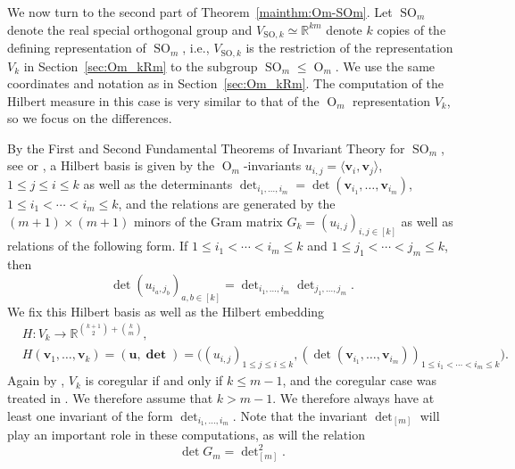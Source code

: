 \documentclass[twoside]{amsart}
\theoremstyle{definition}
\theoremstyle{remark}
\numberwithin{equation}{section}
\newcommand{\R}{\mathbb{R}}
\newcommand{\OO}{\operatorname{O}}
\newcommand{\SO}{\operatorname{SO}}
\begin{document}
We now turn to the second part of Theorem~\ref{mainthm:Om-SOm}.
Let $\SO_m$ denote the real special orthogonal group and $V_{\text{SO},k}\simeq\R^{km}$ denote $k$ copies of the defining representation of $\SO_m$, i.e.,
$V_{\text{SO},k}$ is the restriction of the representation $V_k$ in Section~\ref{sec:Om_kRm} to the subgroup $\SO_m \leq \OO_m$. We use the same coordinates
and notation as in Section~\ref{sec:Om_kRm}. The computation of the Hilbert measure in this case is very similar to that of the $\OO_m$ representation $V_k$,
so we focus on the differences.

By the First and Second Fundamental Theorems of Invariant Theory for $\SO_m$, see \cite[Sec.~9.2 and 9.4]{PopovVinberg} or \cite[Ch.~11, Sec.~2.1 and 5.2]{ProcesiLieGroups},
a Hilbert basis is given by the $\OO_m$-invariants $u_{i,j} = \langle\mathbf{v}_i,\mathbf{v}_j\rangle$, $1\leq j\leq i\leq k$ as well as the determinants
$\det\nolimits_{i_1,\ldots,i_m} = \det(\mathbf{v}_{i_1},\ldots,\mathbf{v}_{i_m})$, $1\leq i_1 < \cdots < i_m \leq k$, and the relations are generated by
the $(m+1)\times(m+1)$ minors of the Gram matrix $G_k = (u_{i,j})_{i,j\in[k]}$ as well as relations of the following form. If $1\leq i_1 < \cdots < i_m \leq k$
and $1\leq j_1 < \cdots < j_m \leq k$, then
\[
    \det( u_{i_a, j_b} )_{a,b \in [k]} = \det\nolimits_{i_1,\ldots,i_m} \det\nolimits_{j_1,\ldots,j_m}.
\]
We fix this Hilbert basis as well as the Hilbert embedding
\begin{equation}
\begin{split}
\label{eq:SOm-HilbertEmbed}
    &H \colon V_k\to\R^{{k+1\choose 2}+{k\choose m}},
    \\
    &H(\mathbf{v}_1,\ldots,\mathbf{v}_k) = (\mathbf{u},\mathbf{\det}) = \big((u_{i,j})_{1\leq j\leq i\leq k},
        (\det(\mathbf{v}_{i_1},\ldots,\mathbf{v}_{i_m}))_{1\leq i_1 < \cdots < i_m \leq k}\big).
\end{split}
\end{equation}
Again by \cite[Thrm~11.18]{GWSlifting}, $V_k$ is coregular if and only if $k\leq m - 1$, and the coregular case was treated in \cite{HerbigSeatonWhitesell}.
We therefore assume that $k > m - 1$. We therefore always have at least one invariant of the form $\det\nolimits_{i_1,\ldots,i_m}$. Note that the invariant
$\det\nolimits_{[m]}$ will play an important role in these computations, as will the relation
\begin{equation}
\label{eq:SOm-MainRelation}
    \det G_m = \det\nolimits_{[m]}^2.
\end{equation}
\end{document}
